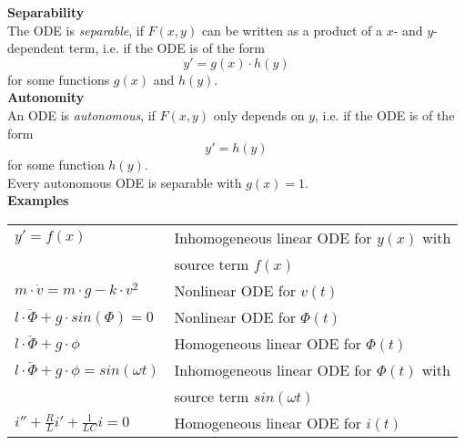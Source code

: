 \textbf{Separability}\\
The ODE is \emph{separable}, if $F(x, y)$ can be written as a product of a $x$- and $y$-dependent term, i.e. if the ODE is of the form
\begin{equation}
  y' = g(x) \cdot h(y)
\end{equation}
for some functions $g(x)$ and $h(y)$.\\

\textbf{Autonomity}\\
An ODE is \emph{autonomous}, if $F(x, y)$ only depends on $y$, i.e. if the ODE is of the form
\begin{equation}
  y' = h(y)
\end{equation}
for some function $h(y)$.\\
Every autonomous ODE is separable with $g(x) = 1$.\\

\textbf{Examples}\\
\begin{tabular}{ll}
  $y' = f(x)$ & Inhomogeneous linear ODE for $y(x)$ with\\
  & source term $f(x)$\\
  $m \cdot \dot{v} = m \cdot g - k \cdot v^2$ & Nonlinear ODE for $v(t)$\\
  $l \cdot \ddot{\Phi} + g \cdot sin(\Phi) = 0$ & Nonlinear ODE for $\Phi(t)$\\
  $l \cdot \ddot{\Phi} + g \cdot \phi$ & Homogeneous linear ODE for $\Phi(t)$\\
  $l \cdot \ddot{\Phi} + g \cdot \phi = sin(\omega t)$ & Inhomogeneous linear ODE for $\Phi(t)$ with\\
  & source term $sin(\omega t)$\\
  $i''+ \frac{R}{L}i' + \frac{1}{LC}i = 0$ & Homogeneous linear ODE for $i(t)$
\end{tabular}

